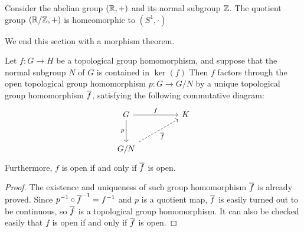 \begin{exmp}
    Consider the abelian group $({\mathbb{R}}, +)$ and its normal subgroup ${\mathbb{Z}}$.
    The quotient group $({\mathbb{R}}/{\mathbb{Z}}, +)$ is homeomorphic to $(S^1, \cdot)$
\end{exmp}

We end this section with a morphism theorem.
\begin{thm}
    Let $f: G\rightarrow H$ be a topological group homomorphism, and suppose that the normal subgroup $N$ of $G$ is contained in $\ker(f)$
    Then $f$ factors through the open topological group homomorphism $p: G\rightarrow G/N$ by a unique topological group homomorphism $\overline{f}$, satisfying the following commutative diagram:
    \begin{equation*}
    \begin{tikzcd}[row sep=large, column sep=huge]
        G
        \arrow[r, "f"]
        \arrow[d, "p"']
        &
        K\\
        G/N
        \arrow[ur, "\ol f"', dashed]
    \end{tikzcd}
    \end{equation*}
    Furthermore, $f$ is open if and only if $\overline{f}$ is open.
\end{thm}
\begin{proof}
    The existence and uniqueness of such group homomorphism $\overline{f}$ is already proved.
    Since $p^{-1}\circ\overline{f}^{-1}=f^{-1}$ and $p$ is a quotient map, $\overline{f}$ is easily turned out to be continuous, so $\overline{f}$ is a topological group homomorphism.
    It can also be checked easily that $f$ is open if and only if $\overline{f}$ is open.
\end{proof}